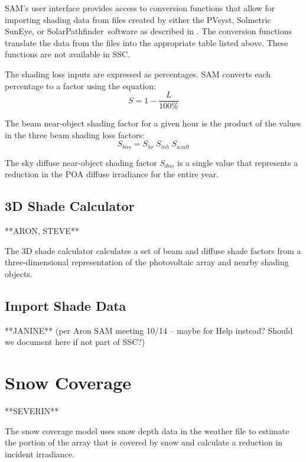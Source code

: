 \documentclass[12pt,letterpaper]{article}
\begin{document}
SAM's user interface provides access to conversion functions that allow for importing shading data from files created by either the PVsyst, Solmetric SunEye, or SolarPathfinder\texttrademark~software as described in \citet{help-shading}. The conversion functions translate the data from the files into the appropriate table listed above. These functions are not available in SSC.

The shading loss inputs are expressed as percentages. SAM converts each percentage to a factor using the equation:
\begin{equation}
S=1-\frac{L}{100\%}
\end{equation}

The beam near-object shading factor for a given hour is the product of the values in the three beam shading loss factors:
\begin{equation}\label{eqn-sbns}
S_{bns}=S_{hr}~S_{mh}~S_{azalt}
\end{equation}

The sky diffuse near-object shading factor $S_{dns}$ is a single value that represents a reduction in the POA diffuse irradiance for the entire year.

\subsection{3D Shade Calculator}\label{sec-3dshad}

**ARON, STEVE**

The 3D shade calculator calculates a set of beam and diffuse shade factors from a three-dimensional representation of the photovoltaic array and nearby shading objects.

\subsection{Import Shade Data}\label{sec-importshad}

**JANINE** (per Aron SAM meeting 10/14 -- maybe for Help instead? Should we document here if not part of SSC?)

\section{Snow Coverage}\label{sec-snow}

**SEVERIN**

The snow coverage model uses snow depth data in the weather file to estimate the portion of the array that is covered by snow and calculate a reduction in incident irradiance.
\end{document}
